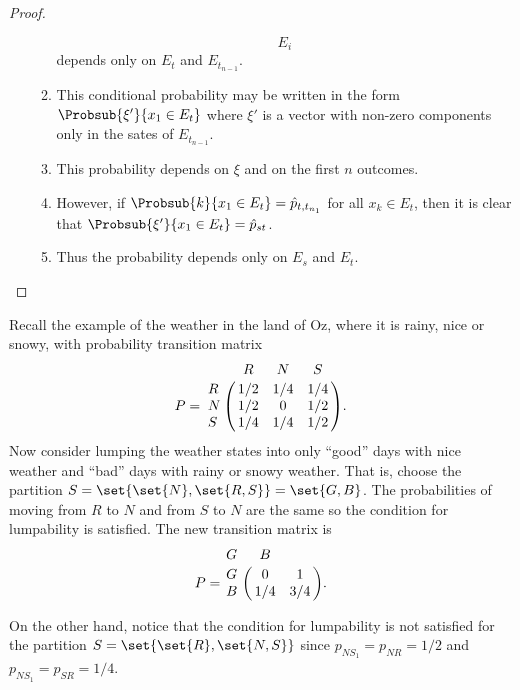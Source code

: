 \documentclass[12pt]{article}
\begin{document}
\begin{proof}
\begin{enumerate}
\begin{enumerate}
\[{                        E_i}
                    \] depends only on \( E_t \) and \( E_{t_{n-1}} \).
                \item
                    This conditional probability may be written in the
                    form \( \Probsub{\xi'}{x_1 \in E_t} \) where \( \xi'
                    \) is a vector with non-zero components only in the
                    sates of \( E_{t_{n-1}} \).
                \item
                    This probability depends on \( \xi \) and on the
                    first \( n \) outcomes.
                \item
                    However, if \( \Probsub{k}{x_1 \in E_t} = \hat{p}_{t,
                    t_{n_1}} \) for all \( x_k \in E_t \), then it is
                    clear that \( \Probsub{\xi'}{x_1 \in E_t} = \hat{p}_
                    {st} \).
                \item
                    Thus the probability depends only on \( E_s \) and \(
                    E_t \).
            \end{enumerate}
    \end{enumerate}
\end{proof}

\begin{example}
    Recall the example of the weather in the land of Oz, where it is
    rainy, nice or snowy, with probability transition matrix
    \[
        P = \bordermatrix{ & R & N & S \cr
        R & 1/2 & 1/4 & 1/4 \cr
        N & 1/2 & 0 & 1/2 \cr
        S & 1/4 & 1/4 & 1/2 }.
    \] Now consider lumping the weather states into only ``good'' days
    with nice weather and ``bad'' days with rainy or snowy weather.
    That is, choose the partition \( S = \set{ \set{N}, \set{R,S}} =
    \set{G, B} \). The probabilities of moving from \( R \) to \( N \)
    and from \( S \) to \( N \) are the same so the condition for
    lumpability is satisfied.  The new transition matrix is
    \[
        P = \bordermatrix{ G & B \cr
        G & 0 & 1 \cr
        B & 1/4 & 3/4}.
    \]

    On the other hand, notice that the condition for lumpability is not
    satisfied for the partition \( S = \set{ \set{R}, \set{N, S}} \)
    since \( p_{N S_1} = p_{NR} = 1/2 \) and \( p_{N S_1} = p_{SR} = 1/4
    \).
  \end{example}
\end{document}
